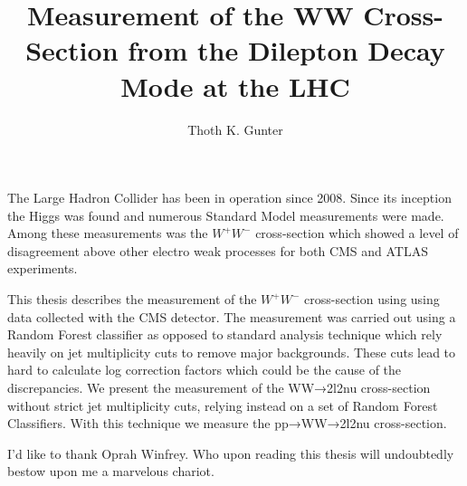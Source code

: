 \documentclass[12pt]{nuthesis}	%
\author{Thoth K. Gunter}
\title{Measurement of the WW Cross-Section from the Dilepton Decay Mode at the LHC}
\begin{document}
%	
%


\frontmatter		%
\maketitle		%
\copyrightpage		%

\abstract		%

\par
The Large Hadron Collider has been in operation since 2008. 
Since its inception the Higgs was found and numerous Standard Model measurements were made.
Among these measurements was the $W^+W^-$ cross-section which showed a level of disagreement above other electro weak processes for both CMS and ATLAS experiments. 


\par
This thesis describes the measurement of the $W^+W^-$ cross-section using using data collected with the CMS detector. 
The measurement was carried out using a Random Forest classifier as opposed to standard analysis technique which rely heavily on jet multiplicity cuts to remove major backgrounds. 
These cuts lead to hard to calculate log correction factors which could be the cause of the discrepancies. 
We present the measurement of the WW→2l2nu cross-section without strict jet multiplicity cuts, relying instead on a set of Random Forest Classifiers. 
With this technique we measure the pp→WW→2l2nu cross-section.

\acknowledgements	%

I'd like to thank Oprah Winfrey. Who upon reading this thesis will undoubtedly bestow upon me a marvelous chariot.



%
%
%
%
%
%
%
%

\clearpage{} %
\tableofcontents	%
\end{document}
